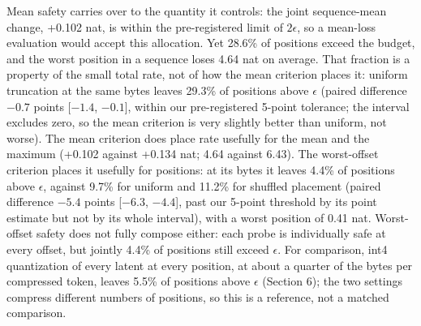 \documentclass[10pt]{article}
\begin{document}
\begin{table}[t]
\centering
\caption{Joint truncation of all 32 probe positions per sequence (250M, 24 sequences, $\epsilon=0.10$ nat). "Own" uses each position's own safe rate; "uniform" and "shuffled" spend the same rate sum (uniform up to rounding). The maximum is the largest single-position loss change per sequence, averaged over sequences. Brackets: 95\% sequence-bootstrap intervals.}
\end{table}

Mean safety carries over to the quantity it controls: the joint sequence-mean change, +0.102 nat, is within the pre-registered limit of $2\epsilon$, so a mean-loss evaluation would accept this allocation. Yet 28.6\% of positions exceed the budget, and the worst position in a sequence loses 4.64 nat on average. That fraction is a property of the small total rate, not of how the mean criterion places it: uniform truncation at the same bytes leaves 29.3\% of positions above $\epsilon$ (paired difference $-0.7$ points [$-1.4$, $-0.1$], within our pre-registered 5-point tolerance; the interval excludes zero, so the mean criterion is very slightly better than uniform, not worse). The mean criterion does place rate usefully for the mean and the maximum (+0.102 against +0.134 nat; 4.64 against 6.43). The worst-offset criterion places it usefully for positions: at its bytes it leaves 4.4\% of positions above $\epsilon$, against 9.7\% for uniform and 11.2\% for shuffled placement (paired difference $-5.4$ points [$-6.3$, $-4.4$], past our 5-point threshold by its point estimate but not by its whole interval), with a worst position of 0.41 nat. Worst-offset safety does not fully compose either: each probe is individually safe at every offset, but jointly 4.4\% of positions still exceed $\epsilon$. For comparison, int4 quantization of every latent at every position, at about a quarter of the bytes per compressed token, leaves 5.5\% of positions above $\epsilon$ (Section 6); the two settings compress different numbers of positions, so this is a reference, not a matched comparison.
\end{document}
